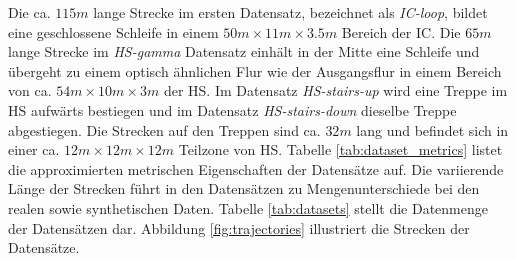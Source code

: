 Die ca. $115m$ lange Strecke im ersten Datensatz, bezeichnet als \textit{IC-loop}, bildet eine geschlossene Schleife in einem $50m \times 11m \times 3.5m$ Bereich der IC. Die $65m$ lange Strecke im \textit{HS-gamma} Datensatz einhält in der Mitte eine Schleife und übergeht zu einem optisch ähnlichen Flur wie der Ausgangsflur in einem Bereich von ca. $54m \times 10m \times 3m$ der HS. Im Datensatz \textit{HS-stairs-up} wird eine Treppe im HS aufwärts bestiegen und im Datensatz \textit{HS-stairs-down} dieselbe Treppe abgestiegen. Die Strecken auf den Treppen sind ca. $32m$ lang und befindet sich in einer ca. $12m \times 12m \times 12m$ Teilzone von HS.
Tabelle \ref{tab:dataset_metrics} listet die approximierten metrischen Eigenschaften der Datensätze auf. 
Die variierende Länge der Strecken führt in den Datensätzen zu Mengenunterschiede bei den realen sowie synthetischen Daten. Tabelle \ref{tab:datasets} stellt die Datenmenge der Datensätzen dar.
Abbildung \ref{fig:trajectories} illustriert die Strecken der Datensätze. 

